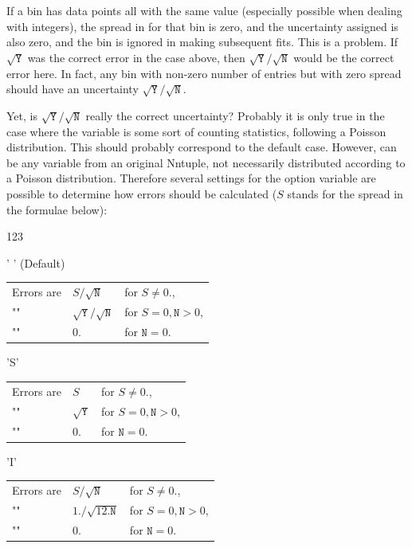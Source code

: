 If a bin has  data points all with the same value  (especially
possible when dealing with integers), the spread in  for that bin
is zero, and the uncertainty assigned is also zero, and the bin is
ignored in making subsequent fits. 
This is a problem. 
If $\sqrt{\mathtt{Y}}$ was the correct error in the case above, 
then $\sqrt{\mathtt{Y}}/\sqrt{\mathtt{N}}$
would be the correct error here.
In fact, any bin with non-zero number of entries  
but with zero spread
should have an uncertainty $\sqrt{\mathtt{Y}}/\sqrt{\mathtt{N}}$.

Yet, is $\sqrt{\mathtt{Y}}/\sqrt{\mathtt{N}}$ 
really the correct uncertainty? 
Probably it is only true in the case where the variable 
is some sort of counting statistics, following a Poisson
distribution. 
This should probably correspond to the default case. 
However,  can be any variable
from an original Nntuple, not necessarily distributed according
to a Poisson distribution. 
Therefore several settings for the option variable 
are possible to determine how errors should be calculated
($S$ stands for the spread in the formulae below):
\begin{DLttc}{123}
\item[' ']   (Default)
           \begin{tabular}{@{\quad}l@{\quad}l@{\quad}l@{}}
           Errors are & $S/\sqrt{\mathtt{N}}$               &for $S\ne0.$,\\
           \quad"\qquad"&$\sqrt{\mathtt{Y}}/\sqrt{\mathtt{N}}$ 
                                                  &for $S=0,\mathtt{N}>0$,\\
           \quad"\qquad"&$0.$                         &for $\mathtt{N}=0$.
           \end{tabular}
\item['S'] \phantom{(Default)}
           \begin{tabular}{@{\quad}l@{\quad}l@{\quad}l@{}}
           Errors are & $S$                                 &for $S\ne0.$,\\
           \quad"\qquad"&$\sqrt{\mathtt{Y}}$      &for $S=0,\mathtt{N}>0$,\\
           \quad"\qquad"&$0.$                         &for $\mathtt{N}=0$.
           \end{tabular}
\item['I'] \phantom{(Default)}
           \begin{tabular}{@{\quad}l@{\quad}l@{\quad}l@{}}
           Errors are & $S/\sqrt{\mathtt{N}}$               &for $S\ne0.$,\\
           \quad"\qquad"&$1./\sqrt{12.\mathtt{N}}$&for $S=0,\mathtt{N}>0$,\\
           \quad"\qquad"&$0.$                         &for $\mathtt{N}=0$.
           \end{tabular}
\end{DLttc}

